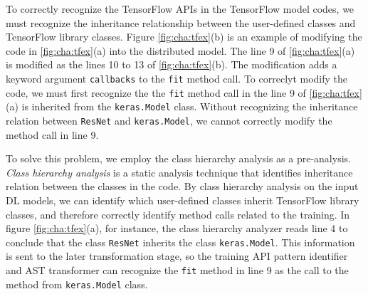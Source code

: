To correctly recognize the TensorFlow APIs in the TensorFlow model codes, 
we must recognize the inheritance relationship between the user-defined classes 
and TensorFlow library classes.
Figure \ref{fig:cha:tfex}(b) is an example of modifying the code in 
\ref{fig:cha:tfex}(a) into the distributed model.
The line 9 of \ref{fig:cha:tfex}(a) is modified as the lines 10 to 13 of 
\ref{fig:cha:tfex}(b). The modification adds a keyword argument {\tt callbacks}
to the {\tt fit} method call. 
To correclyt modify the code, we must first recognize the the {\tt fit} method
call in the line 9 of \ref{fig:cha:tfex}(a) is inherited from the
{\tt keras.Model} class.
Without recognizing the inheritance relation between {\tt ResNet} and
{\tt keras.Model}, we cannot correctly modify the method call in line 9.  

To solve this problem, we employ the class hierarchy analysis as a pre-analysis.
\textit{Class hierarchy analysis} is a static analysis technique that identifies
inheritance relation between the classes in the code.
By class hierarchy analysis on the input DL models,
we can identify which user-defined classes inherit TensorFlow library classes,
and therefore correctly identify method calls related to the training.
In figure \ref{fig:cha:tfex}(a), for instance, 
the class hierarchy analyzer reads line 4 to conclude that the class
{\tt ResNet} inherits the class {\tt keras.Model}.
This information is sent to the later transformation stage,
so the training API pattern identifier and AST transformer can 
recognize the {\tt fit} method in line 9 as the call to the method from
{\tt keras.Model} class.

